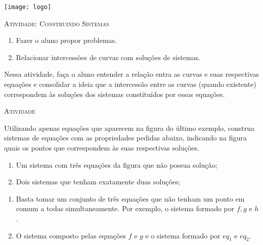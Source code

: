 \documentclass[10 pt,usenames,dvipsnames, oneside]{article}
\begin{document}
\begin{center}
  \begin{minipage}[l]{3cm}
\texttt{[image: logo]}    
\end{minipage}\hfill
\begin{minipage}[r]{.8\textwidth}
 {\Large \scshape Atividade: Construindo Sistemas}  
\end{minipage}
\end{center}
\vspace{.2cm}

\ifdefined\prof

\begin{goals}
\begin{enumerate}
\item Fazer o aluno propor problemas.
\item Relacionar intercessões de curvas com soluções de sistemas. 
\end{enumerate}

\tcblower

Nessa atividade, faça o aluno entender a relação entra as curvas e suas respectivas equações e consolidar a ideia que a intercessão entre as curvas (quando existente) correspondem às soluções dos sistemas constituídos por essas equações. 
\end{goals}

\bigskip
\begin{center}
{\large \scshape Atividade}
\end{center}
\fi

Utilizando apenas equações que aparecem na figura do último exemplo, construa sistemas de equações com as propriedades pedidas abaixo, indicando na figura quais os pontos que correspondem às suas respectivas soluções.

\begin{enumerate}
\item{}
Um sistema com três equações da figura que não possua solução;

\item{}
Dois sistemas que tenham exatamente duas soluções;


\end{enumerate}

\ifdefined\prof
\begin{solucao}

\begin{enumerate}
\item Basta tomar um conjunto de três equações que não tenham um ponto em comum a todas simultaneamente. Por exemplo, o sistema formado por $f, g$ e $h$.
\item O sistema composto pelas equações $f$ e $g$ e o sistema formado por $eq_1$ e $eq_2$.
\end{enumerate}

\end{solucao}
\fi
\end{document}
